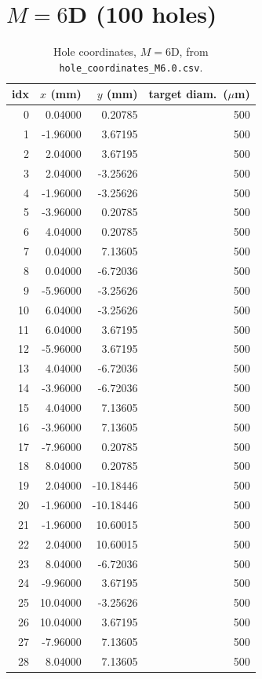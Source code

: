 \section{$M=6$D (100 holes)}
\begin{longtable}{rrrr}
\caption{Hole coordinates, $M=6$D, from \texttt{hole\_coordinates\_M6.0.csv}.}\\
\toprule
idx & $x$ (mm) & $y$ (mm) & target diam.\ ($\mu$m) \\
\midrule
\endhead
0 & 0.04000 & 0.20785 & 500 \\
1 & -1.96000 & 3.67195 & 500 \\
2 & 2.04000 & 3.67195 & 500 \\
3 & 2.04000 & -3.25626 & 500 \\
4 & -1.96000 & -3.25626 & 500 \\
5 & -3.96000 & 0.20785 & 500 \\
6 & 4.04000 & 0.20785 & 500 \\
7 & 0.04000 & 7.13605 & 500 \\
8 & 0.04000 & -6.72036 & 500 \\
9 & -5.96000 & -3.25626 & 500 \\
10 & 6.04000 & -3.25626 & 500 \\
11 & 6.04000 & 3.67195 & 500 \\
12 & -5.96000 & 3.67195 & 500 \\
13 & 4.04000 & -6.72036 & 500 \\
14 & -3.96000 & -6.72036 & 500 \\
15 & 4.04000 & 7.13605 & 500 \\
16 & -3.96000 & 7.13605 & 500 \\
17 & -7.96000 & 0.20785 & 500 \\
18 & 8.04000 & 0.20785 & 500 \\
19 & 2.04000 & -10.18446 & 500 \\
20 & -1.96000 & -10.18446 & 500 \\
21 & -1.96000 & 10.60015 & 500 \\
22 & 2.04000 & 10.60015 & 500 \\
23 & 8.04000 & -6.72036 & 500 \\
24 & -9.96000 & 3.67195 & 500 \\
25 & 10.04000 & -3.25626 & 500 \\
26 & 10.04000 & 3.67195 & 500 \\
27 & -7.96000 & 7.13605 & 500 \\
28 & 8.04000 & 7.13605 & 500 \\

\end{longtable}

